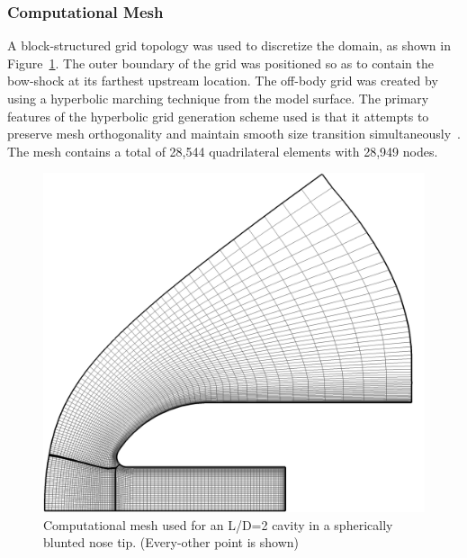 \subsubsection{Computational Mesh}
A block-structured grid topology was used to discretize the domain, as shown in Figure~\ref{fig:cavity_mesh}. The outer boundary of the grid was positioned so as to contain the bow-shock at its farthest upstream location.  The off-body grid was created by using a hyperbolic marching technique from the model surface.  The primary features of the hyperbolic grid generation scheme used is that it attempts to preserve mesh orthogonality and maintain smooth size transition simultaneously~\cite{gridgen}.  The mesh contains a total of 28,544 quadrilateral elements with 28,949 nodes.
\begin{figure}[hbtp]
  \begin{center}
    \includegraphics[width=.85\textwidth]{figures/sphere_cavity/LD_2.0/grid}
    \caption[Computational mesh used for an L/D=2 cavity in a spherically blunted nose tip.]{Computational mesh used for an L/D=2 cavity in a spherically blunted nose tip.  (Every-other point is shown)\label{fig:cavity_mesh}}
  \end{center}
\end{figure}

